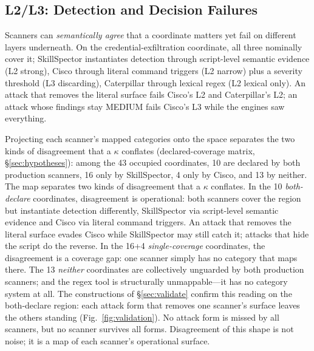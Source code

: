 \documentclass[sigconf,nonacm]{acmart}
\begin{document}
\subsection{L2/L3: Detection and Decision Failures}
Scanners can \emph{semantically agree} that a coordinate matters yet fail on different layers underneath. On the credential-exfiltration coordinate, all three nominally cover it; SkillSpector instantiates detection through script-level semantic evidence (L2 strong), Cisco through literal command triggers (L2 narrow) plus a severity threshold (L3 discarding), Caterpillar through lexical regex (L2 lexical only). An attack that removes the literal surface fails Cisco's L2 and Caterpillar's L2; an attack whose findings stay MEDIUM fails Cisco's L3 while the engines saw everything.

Projecting each scanner's mapped categories onto the space separates the two kinds of disagreement that a $\kappa$ conflates (declared-coverage matrix, \S\ref{sec:hypotheses}): among the 43 occupied coordinates, 10 are declared by both production scanners, 16 only by SkillSpector, 4 only by Cisco, and 13 by neither. The map separates two kinds of disagreement that a $\kappa$ conflates. In the 10 \emph{both-declare} coordinates, disagreement is operational: both scanners cover the region but instantiate detection differently, SkillSpector via script-level semantic evidence and Cisco via literal command triggers. An attack that removes the literal surface evades Cisco while SkillSpector may still catch it; attacks that hide the script do the reverse. In the 16+4 \emph{single-coverage} coordinates, the disagreement is a coverage gap: one scanner simply has no category that maps there. The 13 \emph{neither} coordinates are collectively unguarded by both production scanners; and the regex tool is structurally unmappable---it has no category system at all. The constructions of \S\ref{sec:validate} confirm this reading on the both-declare region: each attack form that removes one scanner's surface leaves the others standing (Fig.~\ref{fig:validation}). No attack form is missed by all scanners, but no scanner survives all forms. Disagreement of this shape is not noise; it is a map of each scanner's operational surface.
\end{document}
